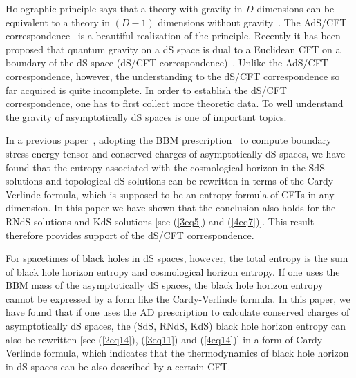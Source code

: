 \documentclass[a4paper,12pt]{article}
\begin{document}
Holographic principle says that a theory with gravity in $D$ dimensions can be equivalent to
a theory in $(D-1)$ dimensions without gravity~\cite{Hooft}. The AdS/CFT 
correspondence~\cite{Mald} is a beautiful realization of the principle. Recently it has been
proposed that quantum gravity on a dS space is dual to a Euclidean CFT on a boundary of
the dS space (dS/CFT correspondence)~\cite{Stron1}. Unlike the AdS/CFT 
correspondence, however, the understanding to the dS/CFT correspondence so far acquired 
is quite incomplete.  In order to establish the dS/CFT correspondence, one has to first
collect more theoretic data. To well understand the gravity of asymptotically dS spaces is 
one of important topics.  

In a previous paper~\cite{Cai1}, adopting the BBM prescription~\cite{BBM} to compute 
boundary stress-energy tensor and conserved charges of asymptotically dS spaces, we have found
that the entropy associated with the cosmological horizon in the SdS solutions and topological 
dS solutions can be rewritten in terms of the Cardy-Verlinde formula, which is supposed
 to be an entropy formula of CFTs in any dimension. In this paper we have shown that
the conclusion also holds for the RNdS solutions and KdS solutions [see (\ref{3eq5}) and
(\ref{4eq7})].  This result therefore provides support of the dS/CFT correspondence.   

For spacetimes of black holes in dS spaces, however, the total entropy is the sum of black
hole horizon entropy and cosmological horizon entropy. If one uses the BBM mass of
the asymptotically dS spaces, the black hole horizon entropy cannot be expressed by a form
like the Cardy-Verlinde formula.  In this paper, we have found that if one uses the AD
prescription to calculate conserved charges of asymptotically dS spaces, the (SdS, RNdS, KdS)
black hole horizon entropy can also be rewritten [see (\ref{2eq14}), (\ref{3eq11}) and
(\ref{4eq14})] in a form of Cardy-Verlinde formula, which
indicates that the thermodynamics of black hole horizon in dS spaces can be also described by a
certain CFT.  
 
\end{document}
